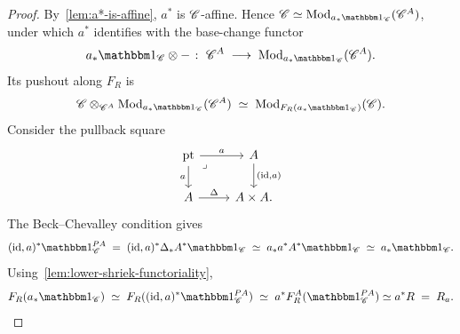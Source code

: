 \documentclass[english,svgnames,table]{article}
\begin{document}
    \begin{proof}
        By~\cref{lem:a*-is-affine}, $a^*$ is $\mathscr{C}$-affine. Hence $\cC \simeq \Mod_{a_* \ounit_{\cC}}(\cC^A)$, under which $a^*$ identifies with the base-change functor
        \begin{equation*}
            a_* \ounit_{\cC} \otimes - \;\colon\; \cC^A \;\too\; \Mod_{a_* \ounit_{\cC}}(\cC^A).
        \end{equation*}
        Its pushout along $F_R$ is
        \begin{equation*}
            \cC \otimes_{\cC^A} \Mod_{a_* \ounit_{\cC}}(\cC^A) \;\simeq\; \Mod_{F_R(a_* \ounit_{\cC})}(\cC).
        \end{equation*}
        Consider the pullback square
        \begin{equation*}
            \begin{tikzcd}
                \pt & A \\
                A & {A\times A.}
                \arrow["a", from=1-1, to=1-2]
                \arrow["a"', from=1-1, to=2-1]
                \arrow["\lrcorner"{anchor=center, pos=0.125}, draw=none, from=1-1, to=2-2]
                \arrow["{(\id, a)}", from=1-2, to=2-2]
                \arrow["\Delta", from=2-1, to=2-2]
            \end{tikzcd}
        \end{equation*}
        The Beck--Chevalley condition gives
        \begin{equation*}
            (\id, a)^* \ounit_{\cC}^{\Path A} \;=\; (\id, a)^* \Delta_* A^* \ounit_{\cC} \;\simeq\; a_* a^* A^* \ounit_{\cC} \;\simeq\; a_* \ounit_{\cC}.
        \end{equation*}
        Using~\cref{lem:lower-shriek-functoriality},
        \begin{equation*}
            F_R(a_* \ounit_{\cC}) \;\simeq\; F_R((\id,a)^* \ounit_{\cC}^{\Path A}) \;\simeq\; a^* F_R^A(\ounit_{\cC}^{\Path A}) \simeq a^* R \;=\; R_a.
        \end{equation*}
    \end{proof}

\end{document}

